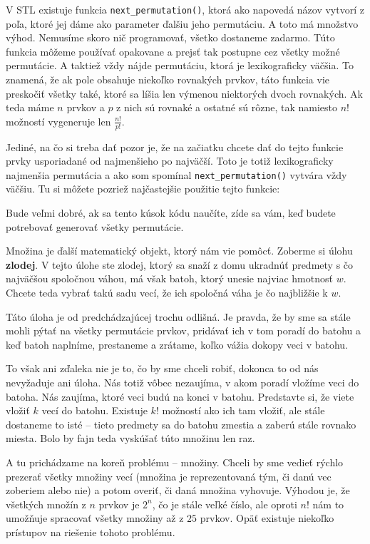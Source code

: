 V STL existuje funkcia \texttt{next\_permutation()}, ktorá ako napovedá názov vytvorí z poľa, ktoré
jej dáme ako parameter ďalšiu jeho permutáciu. A toto má množstvo výhod. Nemusíme skoro nič
programovať, všetko dostaneme zadarmo. Túto funkcia môžeme používať opakovane a prejsť tak postupne
cez všetky možné permutácie. A taktiež vždy nájde permutáciu, ktorá je lexikograficky väčšia. To
znamená, že ak pole obsahuje niekoľko rovnakých prvkov, táto funkcia vie preskočiť všetky také,
ktoré sa líšia len výmenou niektorých dvoch rovnakých. Ak teda máme $n$ prvkov a $p$ z nich sú
rovnaké a ostatné sú rôzne, tak namiesto $n!$ možností vygeneruje len $\frac{n!}{p!}$.

Jediné, na čo si treba dať pozor je, že na začiatku chcete dať do tejto funkcie prvky usporiadané od
najmenšieho po najväčší. Toto je totiž lexikograficky najmenšia permutácia a ako som spomínal
\texttt{next\_permutation()} vytvára vždy väčšiu. Tu si môžete pozriež najčastejšie použitie tejto
funkcie:


Bude veľmi dobré, ak sa tento kúsok kódu naučíte, zíde sa vám, keď budete potrebovať generovať všetky
permutácie.


Množina je ďalší matematický objekt, ktorý nám vie pomôcť. Zoberme si úlohu \textbf{zlodej}. V tejto
úlohe ste zlodej, ktorý sa snaží z domu ukradnúť predmety s čo najväčšou spoločnou váhou, má však
batoh, ktorý unesie najviac hmotnosť $w$. Chcete teda vybrať takú sadu vecí, že ich spoločná váha je
čo najbližšie k $w$.

Táto úloha je od predchádzajúcej trochu odlišná. Je pravda, že by sme sa stále mohli pýtať na všetky
permutácie prvkov, pridávať ich v tom poradí do batohu a keď batoh naplníme, prestaneme a zrátame,
koľko vážia dokopy veci v batohu.

To však ani zďaleka nie je to, čo by sme chceli robiť, dokonca to od nás nevyžaduje ani úloha. Nás
totiž vôbec nezaujíma, v akom poradí vložíme veci do batoha. Nás zaujíma, ktoré veci budú na konci v
batohu. Predstavte si, že viete vložiť $k$ vecí do batohu. Existuje $k!$ možností ako ich tam
vložiť, ale stále dostaneme to isté -- tieto predmety sa do batohu zmestia a zaberú stále rovnako
miesta. Bolo by fajn teda vyskúšať túto množinu len raz.

A tu prichádzame na koreň problému -- množiny. Chceli by sme vedieť rýchlo prezerať všetky množiny
vecí (množina je reprezentovaná tým, či danú vec zoberiem alebo nie) a potom overiť, či daná
množina vyhovuje. Výhodou je, že všetkých množín z $n$ prvkov je $2^n$, čo je stále veľké číslo, ale
oproti $n!$ nám to umožňuje spracovať všetky množiny až z $25$ prvkov.
Opäť existuje niekoľko prístupov na riešenie tohoto problému.

